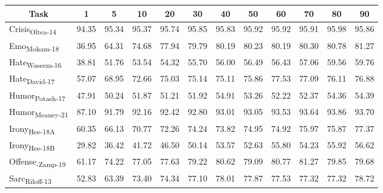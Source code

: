 \begin{table*}[ht]
\small
\centering
\begin{tabular}{@{}lccccccccccc@{}}
\toprule
\multicolumn{1}{c}{\textbf{Task}}                & \textbf{1} & \textbf{5} & \textbf{10} & \textbf{20} & \textbf{30} & \textbf{40} & \textbf{50} & \textbf{60} & \textbf{70} & \textbf{80} & \textbf{90} \\ \midrule
Crisis\textsubscript{Oltea-14}  & 94.35      & 95.34      & 95.37       & 95.74       & 95.85       & 95.83       & 95.92       & 95.92       & 95.91       & 95.98       & 95.86       \\
Emo\textsubscript{Moham-18}     & 36.95      & 64.31      & 74.68       & 77.94       & 79.79       & 80.19       & 80.23       & 80.19       & 80.30       & 80.78       & 81.27       \\
Hate\textsubscript{Waseem-16}   & 38.81      & 51.76      & 53.54       & 54.32       & 55.70       & 56.00       & 56.49       & 56.43       & 57.06       & 59.56       & 59.76       \\
Hate\textsubscript{David-17}    & 57.07      & 68.95      & 72.66       & 75.03       & 75.14       & 75.11       & 75.86       & 77.53       & 77.09       & 76.11       & 76.88       \\
Humor\textsubscript{Potash-17}  & 47.91      & 50.24      & 51.87       & 51.21       & 51.92       & 54.91       & 53.26       & 52.22       & 52.37       & 54.36       & 54.39       \\
Humor\textsubscript{Meaney-21}  & 87.10      & 91.79      & 92.16       & 92.42       & 92.80       & 93.01       & 93.05       & 93.53       & 93.64       & 93.86       & 93.70       \\
Irony\textsubscript{Hee-18A}    & 60.35      & 66.13      & 70.77       & 72.26       & 74.24       & 73.82       & 74.95       & 74.92       & 75.97       & 75.87       & 77.37       \\
Irony\textsubscript{Hee-18B}    & 29.82      & 36.42      & 41.72       & 46.50       & 50.14       & 53.57       & 52.63       & 55.80       & 54.23       & 55.92       & 56.62       \\
Offense\textsubscript{-Zamp-19} & 61.17      & 74.22      & 77.05       & 77.63       & 79.22       & 80.62       & 79.09       & 80.77       & 81.27       & 79.85       & 79.68       \\
Sarc\textsubscript{Riloff-13}   & 52.83      & 63.39      & 73.40       & 74.34       & 77.10       & 78.01       & 77.87       & 77.53       & 77.32       & 77.32       & 78.72       \\

\end{tabular}
\end{table*}
